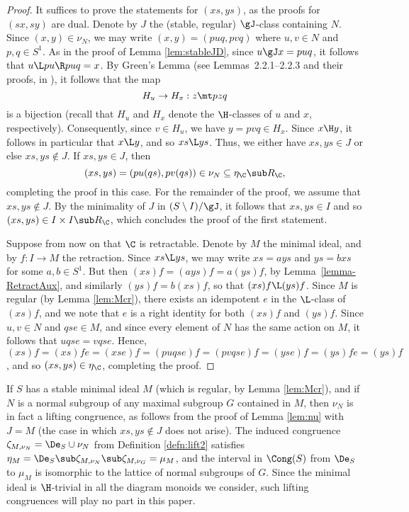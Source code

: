 \begin{proof}
It suffices to prove the statements for $(xs,ys)$, as the proofs for $(sx, sy)$ are dual.  Denote by $J$ the (stable, regular) $\gJ$-class containing $N$.  Since $(x,y)\in\nu_N$, we may write $(x,y)=(puq,pvq)$ where $u,v\in N$ and $p,q\in S^1$.  
%
As in the proof of Lemma \ref{lem:stableJD}, since $u\gJ x=puq$, it follows that $u\L pu \R puq=x$.  By Green's Lemma (see Lemmas~2.2.1--2.2.3 and their proofs, in \cite{Howie}), it follows that the map
\[
H_u\to H_x:z\mt pzq
\]
is a bijection (recall that $H_u$ and $H_x$ denote the $\H$-classes of $u$ and $x$, respectively).  Consequently, since $v\in H_u$, we have ${y=pvq\in H_x}$.  
%
Since $x\H y$, it follows in particular that $x\L y$, and so $xs\L ys$.  Thus, we either have $xs, ys \in J$ or else $xs, ys\not\in J$.  If $xs,ys\in J$, then
\[
(xs,ys)=(pu(qs),pv(qs))\in\nu_N \subseteq \eta_\C \sub R_{\C},
\]
completing the proof in this case.
%
For the remainder of the proof, we assume that $xs,ys\not\in J$.  By the minimality of $J$ in $(S\setminus I)/{\gJ}$,
it follows that $xs,ys\in I$ and so $(xs, ys)\in I\times I \sub R_{\C}$, which
concludes the proof of the first statement.

Suppose from now on that $\C$ is retractable. Denote by $M$ the minimal ideal, and by $f:I\to M$ the retraction.  Since $xs\L ys$, we may write $xs=ays$ and $ys=bxs$ for some $a,b\in S^1$.  But then $(xs)f=(ays)f=a(ys)f$, by Lemma~\ref{lemma-RetractAux}, and similarly $(ys)f=b(xs)f$, so that $(xs)f\L (ys)f$.  Since $M$ is regular (by Lemma \ref{lem:Mcr}), there exists an idempotent $e$ in the $\L$-class of $(xs)f$, and we note that $e$ is a right identity for both $(xs)f$ and $(ys)f$.  Since $u,v\in N$ and $qse\in M$, and since every element of $N$ has the same action on $M$, it follows that $uqse=vqse$. Hence, $(xs)f=(xs)fe=(xse)f=(puqse)f=(pvqse)f=(yse)f=(ys)fe=(ys)f$, and so $(xs,ys)\in \eta_{\C}$, completing the proof.
\end{proof}

\begin{rem}
If $S$ has a stable minimal ideal $M$ (which is regular, by Lemma \ref{lem:Mcr}), and if $N$ is a normal subgroup of any maximal subgroup $G$ contained in $M$, then $\nu_N$ is in fact a lifting congruence, as follows from the proof of Lemma \ref{lem:nu} with $J=M$ (the case in which $xs,ys\not\in J$ does not arise).  The induced congruence $\zeta_{M,\nu_N}=\De_S\cup\nu_N$ from Definition \ref{defn:lift2} satisfies $\eta_M=\De_S\sub\zeta_{M,\nu_N}\sub\zeta_{M,\nu_G}=\mu_M$, and the interval in $\Cong(S)$ from $\De_S$ to $\mu_M$ is isomorphic to the lattice of normal subgroups of $G$.  Since the minimal ideal is $\H$-trivial in all the diagram monoids we consider, such lifting congruences will play no part in this paper.  
\end{rem}

